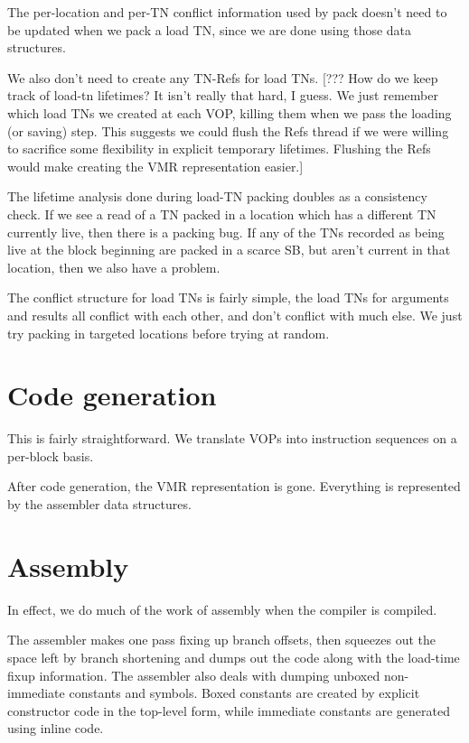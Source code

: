 The per-location and per-TN conflict information used by pack doesn't
need to be updated when we pack a load TN, since we are done using those data
structures.

We also don't need to create any TN-Refs for load TNs.  [??? How do we keep
track of load-tn lifetimes?  It isn't really that hard, I guess.  We just
remember which load TNs we created at each VOP, killing them when we pass the
loading (or saving) step.  This suggests we could flush the Refs thread if we
were willing to sacrifice some flexibility in explicit temporary lifetimes.
Flushing the Refs would make creating the VMR representation easier.]

The lifetime analysis done during load-TN packing doubles as a consistency
check.  If we see a read of a TN packed in a location which has a different TN
currently live, then there is a packing bug.  If any of the TNs recorded as
being live at the block beginning are packed in a scarce SB, but aren't current
in that location, then we also have a problem.

The conflict structure for load TNs is fairly simple, the load TNs for
arguments and results all conflict with each other, and don't conflict with
much else.  We just try packing in targeted locations before trying at random.


\chapter{Code generation}

This is fairly straightforward.  We translate VOPs into instruction sequences
on a per-block basis.

After code generation, the VMR representation is gone.  Everything is
represented by the assembler data structures.

\chapter{Assembly}

In effect, we do much of the work of assembly when the compiler is compiled.

The assembler makes one pass fixing up branch offsets, then squeezes out the
space left by branch shortening and dumps out the code along with the load-time
fixup information.  The assembler also deals with dumping unboxed non-immediate
constants and symbols.  Boxed constants are created by explicit constructor
code in the top-level form, while immediate constants are generated using
inline code.

